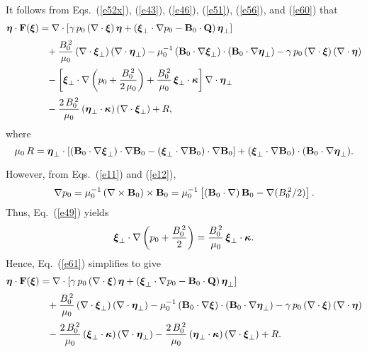 \documentclass[12pt,prb,aps,notitlepage]{revtex4-1}
\newcommand{\bxi}{\mbox{\boldmath$\xi$}}
\newcommand{\bta}{\mbox{\boldmath$\eta$}}
\newcommand{\bkappa}{\mbox{\boldmath$\kappa$}}
\begin{document}
 It follows from Eqs.~(\ref{e52x}), (\ref{e43}), (\ref{e46}),  (\ref{e51}), (\ref{e56}), and (\ref{e60}) that
 \begin{align}\label{e61}
\bta\cdot {\bf F}(\bxi) &=\nabla\cdot\left[\gamma\,p_0\,(\nabla\cdot\bxi)\,\bta+ (\bxi_\perp\cdot\nabla p_0-{\bf B}_0\cdot{\bf Q})\,\bta_\perp\right]\nonumber\\[0.5ex]
&\phantom{=}+\frac{B_0^{\,2}}{\mu_0}\,(\nabla\cdot\bxi_\perp)\,(\nabla\cdot\bta_\perp) 
 -\mu_0^{-1}\,({\bf B}_0\cdot\nabla\bxi_\perp)\cdot
 ({\bf B}_0\cdot\nabla\bta_\perp)-\gamma\,p_0\,(\nabla\cdot\bxi)\,(\nabla\cdot\bta)\nonumber\\[0.5ex]
 &\phantom{=}-\left[\bxi_\perp\cdot\nabla\left(p_0+\frac{B_0^{\,2}}{2\,\mu_0}\right)+ \frac{B_0^{\,2}}{\mu_0}\,\bxi_\perp\cdot\bkappa\right]\nabla\cdot\bta_\perp\nonumber
\\[0.5ex]&
\phantom{=}-\frac{2\,B_0^{\,2}}{\mu_0}\,(\bta_\perp\cdot\bkappa)\,(\nabla\cdot\bxi_\perp) +R,
 \end{align}
 where
 \begin{equation}
 \mu_0\,R= \bta_\perp\cdot\left[({\bf B}_0\cdot\nabla\bxi_\perp)\cdot\nabla {\bf B}_0 - (\bxi_\perp\cdot\nabla {\bf B}_0)\cdot\nabla {\bf B}_0\right]
 + (\bxi_\perp\cdot\nabla {\bf B}_0)\cdot({\bf B}_0\cdot\nabla\bta_\perp).
 \end{equation}
 
 However, from Eqs.~(\ref{e11}) and (\ref{e12}), 
 \begin{equation}\label{e64}
 \nabla p_0 = \mu_0^{-1}\,(\nabla\times{\bf B}_0)\times {\bf B}_0= \mu_0^{-1}\left[({\bf B}_0\cdot\nabla)\,{\bf B}_0-\nabla(B_0^{\,2}/2)\right].
 \end{equation}
 Thus, Eq.~(\ref{e49}) yields
 \begin{equation}
 \bxi_\perp\cdot\nabla\left(p_0 +\frac{B_0^{\,2}}{2}\right) = \frac{B_0^{\,2}}{\mu_0}\,\bxi_\perp\cdot\bkappa.
 \end{equation}
 Hence, Eq.~(\ref{e61}) simplifies to give 
 \begin{align}\label{e65}
\bta\cdot {\bf F}(\bxi) &=\nabla\cdot\left[\gamma\,p_0\,(\nabla\cdot\bxi)\,\bta+ (\bxi_\perp\cdot\nabla p_0-{\bf B}_0\cdot{\bf Q})\,\bta_\perp\right]\nonumber\\[0.5ex]
&\phantom{=}+\frac{B_0^{\,2}}{\mu_0}\,(\nabla\cdot\bxi_\perp)\,(\nabla\cdot\bta_\perp) 
 - \mu_0^{-1}\,({\bf B}_0\cdot\nabla\bxi)\cdot
 ({\bf B}_0\cdot\nabla\bta_\perp)-\gamma\,p_0\,(\nabla\cdot\bxi)\,(\nabla\cdot\bta)\nonumber\\[0.5ex]
 &\phantom{=}-\frac{2\,B_0^{\,2}}{\mu_0}\,(\bxi_\perp\cdot\bkappa)\, (\nabla\cdot\bta_\perp)-\frac{2\,B_0^{\,2}}{\mu_0}\,(\bta_\perp\cdot\bkappa)\,(\nabla\cdot\bxi_\perp) +R.
 \end{align}
\end{document}
